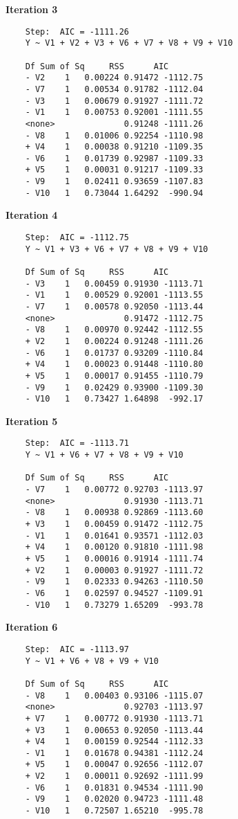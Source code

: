 \documentclass[a4paper,12pt]{article}
\begin{document}
\noindent \textbf{Iteration 3}
\begin{framed}
	\begin{verbatim}
	Step:  AIC = -1111.26
	Y ~ V1 + V2 + V3 + V6 + V7 + V8 + V9 + V10
	
	Df Sum of Sq     RSS      AIC
	- V2    1   0.00224 0.91472 -1112.75
	- V7    1   0.00534 0.91782 -1112.04
	- V3    1   0.00679 0.91927 -1111.72
	- V1    1   0.00753 0.92001 -1111.55
	<none>              0.91248 -1111.26
	- V8    1   0.01006 0.92254 -1110.98
	+ V4    1   0.00038 0.91210 -1109.35
	- V6    1   0.01739 0.92987 -1109.33
	+ V5    1   0.00031 0.91217 -1109.33
	- V9    1   0.02411 0.93659 -1107.83
	- V10   1   0.73044 1.64292  -990.94
	\end{verbatim}
\end{framed}
\newpage
\noindent \textbf{Iteration 4}
\begin{framed}
	\begin{verbatim}
	Step:  AIC = -1112.75
	Y ~ V1 + V3 + V6 + V7 + V8 + V9 + V10
	
	Df Sum of Sq     RSS      AIC
	- V3    1   0.00459 0.91930 -1113.71
	- V1    1   0.00529 0.92001 -1113.55
	- V7    1   0.00578 0.92050 -1113.44
	<none>              0.91472 -1112.75
	- V8    1   0.00970 0.92442 -1112.55
	+ V2    1   0.00224 0.91248 -1111.26
	- V6    1   0.01737 0.93209 -1110.84
	+ V4    1   0.00023 0.91448 -1110.80
	+ V5    1   0.00017 0.91455 -1110.79
	- V9    1   0.02429 0.93900 -1109.30
	- V10   1   0.73427 1.64898  -992.17
	\end{verbatim}
\end{framed}

\noindent \textbf{Iteration 5}
\begin{framed}
	\begin{verbatim}
	Step:  AIC = -1113.71
	Y ~ V1 + V6 + V7 + V8 + V9 + V10
	
	Df Sum of Sq     RSS      AIC
	- V7    1   0.00772 0.92703 -1113.97
	<none>              0.91930 -1113.71
	- V8    1   0.00938 0.92869 -1113.60
	+ V3    1   0.00459 0.91472 -1112.75
	- V1    1   0.01641 0.93571 -1112.03
	+ V4    1   0.00120 0.91810 -1111.98
	+ V5    1   0.00016 0.91914 -1111.74
	+ V2    1   0.00003 0.91927 -1111.72
	- V9    1   0.02333 0.94263 -1110.50
	- V6    1   0.02597 0.94527 -1109.91
	- V10   1   0.73279 1.65209  -993.78
	\end{verbatim}
\end{framed}
\newpage
\noindent \textbf{Iteration 6}
\begin{framed}
	\begin{verbatim}
	Step:  AIC = -1113.97
	Y ~ V1 + V6 + V8 + V9 + V10
	
	Df Sum of Sq     RSS      AIC
	- V8    1   0.00403 0.93106 -1115.07
	<none>              0.92703 -1113.97
	+ V7    1   0.00772 0.91930 -1113.71
	+ V3    1   0.00653 0.92050 -1113.44
	+ V4    1   0.00159 0.92544 -1112.33
	- V1    1   0.01678 0.94381 -1112.24
	+ V5    1   0.00047 0.92656 -1112.07
	+ V2    1   0.00011 0.92692 -1111.99
	- V6    1   0.01831 0.94534 -1111.90
	- V9    1   0.02020 0.94723 -1111.48
	- V10   1   0.72507 1.65210  -995.78
	\end{verbatim}
\end{framed}
\end{document}
